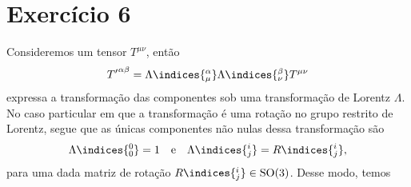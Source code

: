 \section*{Exercício 6}
Consideremos um tensor \(T^{\mu\nu}\), então
\begin{equation*}
    {T'}^{\alpha \beta} = \Lambda\indices{^\alpha_\mu}\Lambda\indices{^\beta_\nu}T^{\mu\nu}
\end{equation*}
expressa a transformação das componentes sob uma transformação de Lorentz \(\Lambda\). No caso particular em que a transformação é uma rotação no grupo restrito de Lorentz, segue que as únicas componentes não nulas dessa transformação são
\begin{equation*}
    \Lambda\indices{^0_0} = 1\quad\text{e}\quad\Lambda\indices{^i_j} = R\indices{^i_j},
\end{equation*}
para uma dada matriz de rotação \(R\indices{^i_j} \in \mathrm{SO}(3)\). Desse modo, temos

